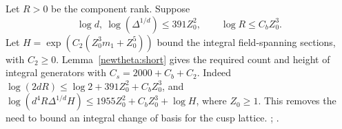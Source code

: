 Let \(R>0\) be the component rank. Suppose
\[
 \log d,\ \log(\Delta^{1/d})\le391 Z_0^2,\qquad \log R\le C_b Z_0^3.
\]
Let \(H=\exp(C_2(Z_0^3m_1+Z_0^5))\) bound the integral
field-spanning sections, with \(C_2\ge0\).
Lemma~\ref{newtheta:short} gives the required count and height of
integral generators with \(C_s=2000+C_b+C_2\). Indeed
\(\log(2dR)\le\log 2+391 Z_0^2+C_bZ_0^3\), and
\(\log(d^4R\Delta^{1/d}H)\le1955 Z_0^2+C_bZ_0^3+\log H\),
where \(Z_0\ge1\). This removes the need to bound an integral change
of basis for the cusp lattice.
;
.

